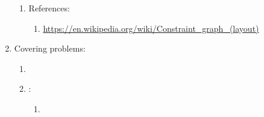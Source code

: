 \begin{enumerate}
\begin{enumerate}
	\item References: \vspace{-0.2cm}
		\begin{enumerate} \itemsep -2pt
		\item \url{https://en.wikipedia.org/wiki/Constraint_graph_(layout)}
		\end{enumerate}
	\end{enumerate}
\item Covering problems: \vspace{-0.3cm}
	\begin{enumerate} \itemsep -2pt
	\item 
	\item : \vspace{-0.2cm}
		\begin{enumerate} \itemsep -2pt
		\item 
		\end{enumerate}
	\end{enumerate}
\end{enumerate}





